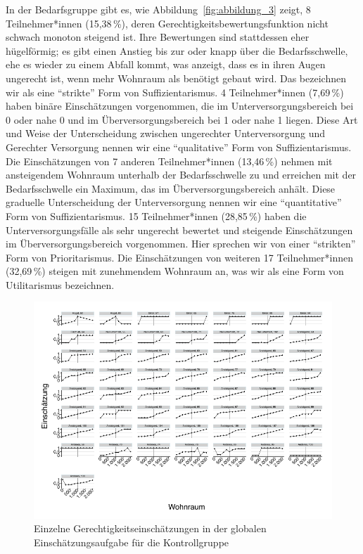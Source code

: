 \documentclass[justified,nobib,nohyper,symmetric,twoside]{tufte-book}
\begin{document}
In der Bedarfsgruppe gibt es, wie Abbildung~\ref{fig:abbildung_3} zeigt, 8 Teilnehmer*innen (15,38\,\%), deren Gerechtigkeitsbewertungsfunktion nicht schwach monoton steigend ist.
Ihre Bewertungen sind stattdessen eher hügelförmig; es gibt einen Anstieg bis zur oder knapp über die Bedarfsschwelle, ehe es wieder zu einem Abfall kommt, was anzeigt, dass es in ihren Augen ungerecht ist, wenn mehr Wohnraum als benötigt gebaut wird.
Das bezeichnen wir als eine \enquote{strikte} Form von Suffizientarismus.
4 Teilnehmer*innen (7,69\,\%) haben binäre Einschätzungen vorgenommen, die im Unterversorgungsbereich bei 0 oder nahe 0 und im Überversorgungsbereich bei 1 oder nahe 1 liegen.
Diese Art und Weise der Unterscheidung zwischen ungerechter Unterversorgung und Gerechter Versorgung nennen wir eine \enquote{qualitative} Form von Suffizientarismus.
Die Einschätzungen von 7 anderen Teilnehmer*innen (13,46\,\%) nehmen mit ansteigendem Wohnraum unterhalb der Bedarfsschwelle zu und erreichen mit der Bedarfsschwelle ein Maximum, das im Überversorgungsbereich anhält.
Diese graduelle Unterscheidung der Unterversorgung nennen wir eine \enquote{quantitative} Form von Suffizientarismus.
15 Teilnehmer*innen (28,85\,\%) haben die Unterversorgungsfälle als sehr ungerecht bewertet und steigende Einschätzungen im Überversorgungsbereich vorgenommen.
Hier sprechen wir von einer \enquote{strikten} Form von Prioritarismus.
Die Einschätzungen von weiteren 17 Teilnehmer*innen (32,69\,\%) steigen mit zunehmendem Wohnraum an, was wir als eine Form von Utilitarismus bezeichnen.

\begin{figure}[t]\label{fig:abbildung_4}
   \center
   \includegraphics[width=0.99\linewidth]{figure_4.pdf}
   \caption{Einzelne Gerechtigkeitseinschätzungen in der globalen Einschätzungsaufgabe für die Kontrollgruppe}
\end{figure}
\end{document}
